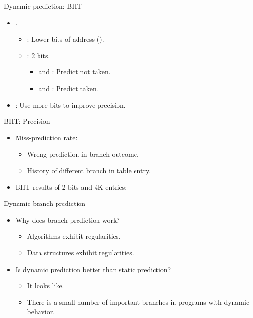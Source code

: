 \begin{frame}[t]{Dynamic prediction: BHT}
\begin{itemize}
  \item {}:
    \begin{itemize}
      \item {}: Lower bits of address ().
      \item {}: 2 bits. 
        \begin{itemize}
          \item {} and : Predict not taken.
          \item {} and : Predict taken.
        \end{itemize}
    \end{itemize}
\end{itemize}

\makebox[\textwidth][c]{

}
\begin{itemize}
  \item {}: Use more bits to improve precision.
\end{itemize}
\end{frame}

\begin{frame}[t,shrink=10]{BHT: Precision}
\begin{itemize}
  \item Miss-prediction rate:
    \begin{itemize}
      \item Wrong prediction in branch outcome.
      \item History of different branch in table entry.
    \end{itemize}
  \item BHT results of 2 bits and 4K entries:
\end{itemize}

\end{frame}

\begin{frame}[t]{Dynamic branch prediction}
\begin{itemize}
  \item Why does branch prediction work?
    \begin{itemize}
      \item Algorithms exhibit regularities.
      \item Data structures exhibit regularities.
    \end{itemize}

  \item Is dynamic prediction better than static prediction?
    \begin{itemize}
      \item It looks like.
      \item There is a small number of important branches in programs with dynamic behavior.
    \end{itemize}
\end{itemize}
\end{frame}
